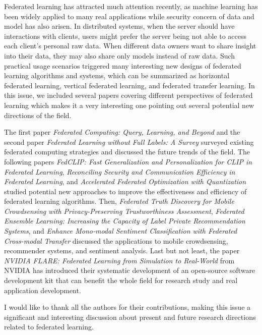 \documentclass[11pt]{article}
\begin{document}
Federated learning has attracted much attention recently, as machine learning has been widely applied to many real applications while security concern of data and model has also arisen. In distributed systems, when the server should have interactions with clients, users might prefer the server being not able to access each client's personal raw data. When different data owners want to share insight into their data, they may also share only models instead of raw data. Such practical usage scenarios triggered many interesting new designs of federated learning algorithms and systems, which can be summarized as horizontal federated learning, vertical federated learning, and federated transfer learning. In this issue, we included several papers covering different perspectives of federated learning which makes it a very interesting one pointing out several potential new directions of the field.

The first paper 
{\it Federated Computing: Query, Learning, and Beyond} and 
the second paper 
{\it Federated Learning without Full Labels: A Survey} 
surveyed existing federated computing strategies and discussed the future trends of the field.
The following papers
{\it FedCLIP: Fast Generalization and Personalization for CLIP in Federated Learning},
{\it Reconciling Security and Communication Efficiency in Federated Learning}, and
{\it Accelerated Federated Optimization with Quantization}
studied potential new approaches to improve the effectiveness and efficiency of federated learning algorithms.
Then,
{\it Federated Truth Discovery for Mobile Crowdsensing with Privacy-Preserving Trustworthiness Assessment},
{\it Federated Ensemble Learning: Increasing the Capacity of Label Private Recommendation Systems}, and
{\it Enhance Mono-modal Sentiment Classification with Federated Cross-modal Transfer}
discussed the applications to mobile crowdsensing, recommender systems, and sentiment analysis.
Last but not least, the paper  
{\it NVIDIA FLARE: Federated Learning from Simulation to Real-World}
from NVIDIA has introduced their systematic development of an open-source software development kit that can benefit the whole field for research study and real application development.


I would like to thank all the authors for their contributions, making this issue a significant and interesting discussion about present and future research directions related to federated learning.
\end{document}
